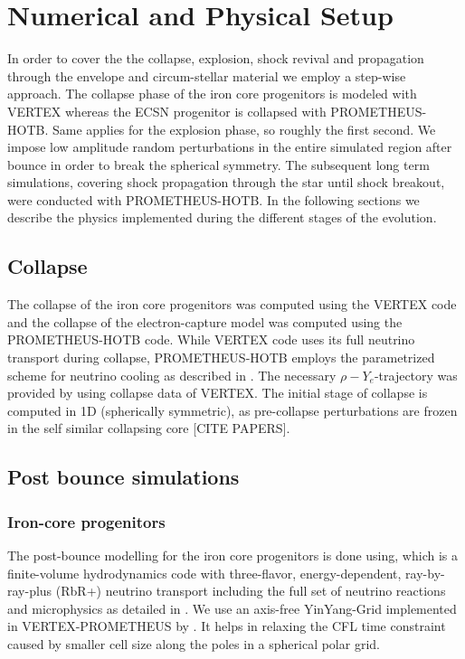 \documentclass[fleqn,usenatbib]{mnras}
\newcommand{\prom}{\textsc{P{\footnotesize ROMETHEUS}-H{\footnotesize OT}B}\xspace}
\newcommand{\vertexprom}{\textsc{V{\footnotesize ERTEX}-P{\footnotesize ROMETHEUS}}\xspace}
\newcommand{\vertex}{\textsc{V{\footnotesize ERTEX}}\xspace}
\newcommand{\NY}[2]{{\color{blue}\sout{#1}#2}}
\begin{document}
\section{Numerical and Physical Setup}
\label{sec:explosionModeling}
In order to cover the the collapse, explosion, shock revival and propagation through the envelope and circum-stellar material we employ a step-wise approach.
The collapse phase of the iron core progenitors is modeled with \vertex whereas the ECSN progenitor is collapsed with \prom.
Same applies for the explosion phase, so roughly the first second.  We impose low amplitude random perturbations in the entire simulated region after bounce in order to break the spherical symmetry. 
The subsequent long term simulations, covering shock propagation through the star until shock breakout, were conducted with \prom.
In the following sections we describe the physics implemented during the different stages of the evolution.

\subsection{Collapse}
The collapse of the iron core progenitors was computed using the \vertex code and the collapse of the  electron-capture model was computed using the \NY{}{\prom} code. While \vertex code uses its full neutrino transport during collapse, \prom employs the parametrized scheme for neutrino cooling as described in \citet{Liebendoerfer2005}. The necessary $\rho-Y_{e}$-trajectory was provided by \cite{Huedepohl2018} using collapse data of \vertex.
The initial stage of collapse is computed in  1D (spherically symmetric), as pre-collapse perturbations are frozen in the self similar collapsing core \NY{}{[CITE PAPERS]}. 

\subsection{Post bounce simulations}
\subsubsection{Iron-core progenitors}
The post-bounce modelling for the iron core progenitors is done using, which is a finite-volume hydrodynamics code with three-flavor, energy-dependent, ray-by-ray-plus (RbR+) neutrino transport including the full set of neutrino reactions and microphysics as detailed in \cite{Rampp2002}. We use an axis-free YinYang-Grid \cite{Kageyama2004} implemented in \vertexprom by \cite{Melson2015}. It  helps in relaxing the CFL time constraint caused by smaller cell size along the poles in a spherical polar grid. 
\end{document}
